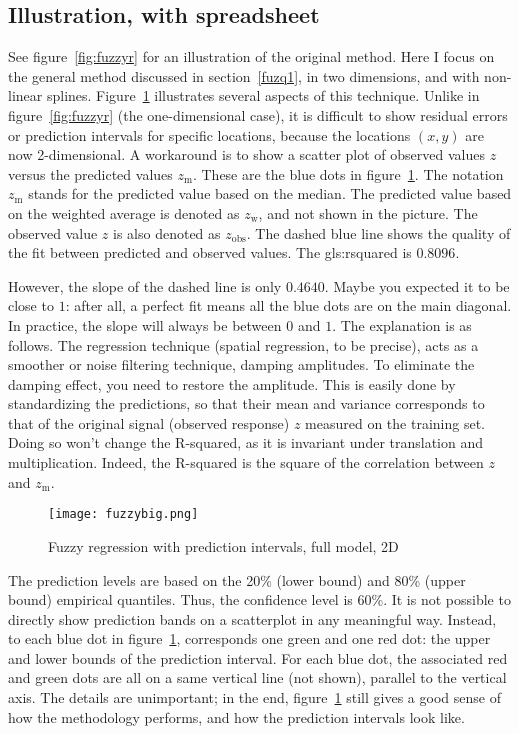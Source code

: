 \documentclass[oneside,10pt]{book}
\begin{document}
\subsection{Illustration, with spreadsheet}

See figure~\ref{fig:fuzzyr} for an illustration of the original method. Here I focus on the general method discussed in section~\ref{fuzq1}, in two dimensions, and with non-linear splines. Figure~\ref{fig:fuzzybig} illustrates several aspects of this technique. Unlike in figure~\ref{fig:fuzzyr} (the one-dimensional case), it is difficult to show residual errors or prediction intervals for specific locations, because the locations $(x,y)$ are now 2-dimensional. A workaround is to show a scatter plot of observed values $z$ versus the predicted values $z_{\text{m}}$. These are the blue dots in
figure~\ref{fig:fuzzybig}. The notation $z_{\text{m}}$ stands for the predicted value based on the median. The predicted value based on the weighted average is denoted as $z_{\text{w}}$, and not shown in the picture. The observed value $z$ is also denoted as $z_{\text{obs}}$. The dashed blue line shows the quality of the fit between predicted and observed values. The \gls{gls:rsquared} is $0.8096$. 

However, the slope of the dashed line is only $0.4640$. Maybe you expected it to be close to $1$: after all, a perfect fit means all the blue dots are on the main diagonal. In practice, the slope will always be between $0$ and $1$. The explanation is as follows. The regression technique (spatial regression, to be precise), acts as a smoother or noise filtering technique, damping amplitudes. To eliminate the damping effect, you need to restore the amplitude. This is easily done by standardizing the predictions, so that their mean and variance corresponds to that of the original signal (observed response) $z$ measured on the training set. Doing so won't change the R-squared, as it is invariant under translation and multiplication. Indeed, the R-squared is the square of the correlation between $z$ and $z_{\text{m}}$.

\begin{figure}%
\centering
\texttt{[image: fuzzybig.png]}
\caption{Fuzzy regression with prediction intervals, full model, 2D}
\label{fig:fuzzybig}
\end{figure}

The prediction levels are based on the 20\% (lower bound) and 80\% (upper bound) empirical quantiles. Thus, the confidence level is 60\%. It is not possible to directly show prediction bands on a scatterplot in any meaningful way. Instead, to each blue dot in figure~\ref{fig:fuzzybig}, corresponds one green and one red dot: the upper and lower bounds of the prediction interval. For each blue dot, the associated red and green dots are all on a same vertical line (not shown), parallel to the vertical axis. The details are unimportant; in the end, figure~\ref{fig:fuzzybig} still gives a good sense of how the methodology performs, and how the prediction intervals look like.
\end{document}
